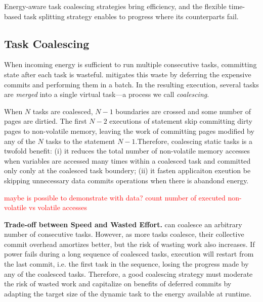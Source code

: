 Energy-aware task coalescing strategies bring \sys efficiency, and the flexible time-based task splitting strategy enables \sys to progress where its counterparts fail.

\subsection{Task Coalescing}
\label{sec:task_coalescing}


When incoming energy is sufficient to run multiple consecutive tasks, committing state after each task is wasteful. \sys mitigates this waste by deferring the expensive commits and performing them in a batch. In the resulting execution, several tasks are \emph{merged} into a single virtual task---a process we call \emph{coalescing}. 

\noindent When $N$ tasks are coalesced, $N-1$ boundaries are crossed and some number of
pages are dirtied. The first $N-2$ executions of \transition statement skip
committing dirty pages to non-volatile memory, leaving the work of committing
pages modified by any of the $N$ tasks to the statement $N-1$.Therefore, coalescing static tasks is a twofold benefit: (i) it reduces the total number of non-volatile memory
accesses when variables are accessed many times within a coalesced task and committed only conly at the coalesced task boundery; (ii) it fasten applicaiton exeution be skipping unnecessary data commits operations when there is abandond energy. 

\textcolor{red}{maybe is possible to demonstrate with data? count number of executed non-volatile vs volatile accesses}
%

\noindent \textbf{Trade-off between Speed and Wasted Effort.} \sys can coalesce an
arbitrary number of consecutive tasks. However, as more tasks coalesce, their
collective commit overhead amortizes better, but the risk of wasting work also
increases. If power fails during a long sequence of coalesced tasks, execution
will restart from the last commit, i.e. the first task in the sequence, losing
the progress made by any of the coalesced tasks. Therefore, a good coalescing strategy must moderate the risk of wasted work and capitalize on benefits of deferred commits by adapting the target size of the dynamic task
to the energy available at runtime. 
%

